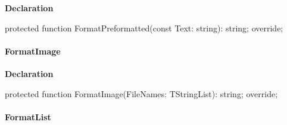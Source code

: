 \documentclass{report}
\newif\ifpdf
\begin{document}
\label{PasDoc_GenHtml.TGenericHTMLDocGenerator-FormatPreformatted}
\begin{list}{}{
\setlength{\itemindent}{0cm}
\setlength{\listparindent}{0cm}
\setlength{\leftmargin}{\evensidemargin}
\addtolength{\leftmargin}{\tmplength}
\settowidth{\labelsep}{X}
\addtolength{\leftmargin}{\labelsep}
\setlength{\labelwidth}{\tmplength}
}
\item[\textbf{Declaration}\hfill]
\ifpdf
\begin{flushleft}
\fi
\begin{ttfamily}
protected function FormatPreformatted(const Text: string): string; override;\end{ttfamily}

\ifpdf
\end{flushleft}
\fi

\end{list}
\paragraph*{FormatImage}\hspace*{\fill}

\label{PasDoc_GenHtml.TGenericHTMLDocGenerator-FormatImage}
\begin{list}{}{
\setlength{\itemindent}{0cm}
\setlength{\listparindent}{0cm}
\setlength{\leftmargin}{\evensidemargin}
\addtolength{\leftmargin}{\tmplength}
\settowidth{\labelsep}{X}
\addtolength{\leftmargin}{\labelsep}
\setlength{\labelwidth}{\tmplength}
}
\item[\textbf{Declaration}\hfill]
\ifpdf
\begin{flushleft}
\fi
\begin{ttfamily}
protected function FormatImage(FileNames: TStringList): string; override;\end{ttfamily}

\ifpdf
\end{flushleft}
\fi

\end{list}
\paragraph*{FormatList}\hspace*{\fill}
\end{document}
